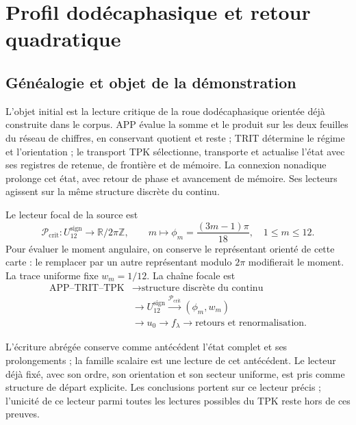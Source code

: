 \section{Profil dodécaphasique et retour quadratique}
\label{hmtfg:fragmento:perfil-dodecafasico-y-retorno-cuadratico}

\subsection{Généalogie et objet de la démonstration}
\label{hmtfg:desarrollo:1}

L’objet initial est la lecture critique de la roue dodécaphasique orientée déjà construite dans le corpus. APP évalue la somme et le produit sur les deux feuilles du réseau de chiffres, en conservant quotient et reste ; TRIT détermine le régime et l’orientation ; le transport TPK sélectionne, transporte et actualise l’état avec ses registres de retenue, de frontière et de mémoire. La connexion nonadique prolonge cet état, avec retour de phase et avancement de mémoire. Ses lecteurs agissent sur la même structure discrète du continu.

Le lecteur focal de la source est
\[
\mathcal P_{\mathrm{crit}}:U_{12}^{\mathrm{sign}}\longrightarrow
\mathbb R/2\pi\mathbb Z,\qquad
m\longmapsto\phi_m=\frac{(3m-1)\pi}{18},\quad 1\le m\le12.
\]
Pour évaluer le moment angulaire, on conserve le représentant orienté de cette carte : le remplacer par un autre représentant modulo \(2\pi\) modifierait le moment. La trace uniforme fixe \(w_m=1/12\). La chaîne focale est
\[\begin{aligned}
\text{APP–TRIT–TPK}&\longrightarrow
\text{structure discrète du continu}\\ &\longrightarrow U_{12}^{\mathrm{sign}}
\xrightarrow{\mathcal P_{\mathrm{crit}}}(\phi_m,w_m)
\\ &\longrightarrow u_0\longrightarrow f_\lambda
\longrightarrow\text{retours et renormalisation}.
\end{aligned}\]

L’écriture abrégée conserve comme antécédent l’état complet et ses prolongements ; la famille scalaire est une lecture de cet antécédent. Le lecteur déjà fixé, avec son ordre, son orientation et son secteur uniforme, est pris comme structure de départ explicite. Les conclusions portent sur ce lecteur précis ; l’unicité de ce lecteur parmi toutes les lectures possibles du TPK reste hors de ces preuves.


